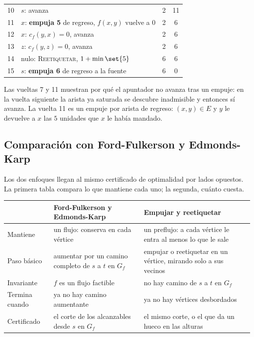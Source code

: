 \documentclass[11pt,letterpaper]{article}
\begin{document}
\begin{ejemplo}
\begin{center}
\begin{tabular}{clcc}
    10 & $s$: avanza & 2 & 11 \\
    11 & $x$: \textbf{empuja 5} de regreso, $f(x, y)$ vuelve a $0$
       & 2 & 6 \\
    12 & $x$: $c_f(y, x) = 0$, avanza & 2 & 6 \\
    13 & $z$: $c_f(y, z) = 0$, avanza & 2 & 6 \\
    14 & nulo: \textsc{Reetiquetar}, $1 + \min\set{5}$ & 6 & 6 \\
    15 & $s$: \textbf{empuja 6} de regreso a la fuente & 6 & 0 \\
    \bottomrule
  \end{tabular}
  \end{center}
  Las vueltas 7 y 11 muestran por qué el apuntador no avanza tras un
  empuje: en la vuelta siguiente la arista ya saturada se descubre
  inadmisible y entonces sí avanza. La vuelta 11 es un empuje por
  arista de regreso: $(x, y) \in E$ y $y$ le devuelve a $x$ las $5$
  unidades que $x$ le había mandado.
\end{ejemplo}


\subsection*{Comparación con Ford-Fulkerson y Edmonds-Karp}

Los dos enfoques llegan al mismo certificado de optimalidad por lados
opuestos. La primera tabla compara lo que mantiene cada uno; la
segunda, cuánto cuesta.

\begin{center}
\small
\begin{tabular}{l>{\raggedright\arraybackslash}p{5.6cm}%
                 >{\raggedright\arraybackslash}p{5.6cm}}
  \toprule
  & \textbf{Ford-Fulkerson y Edmonds-Karp}
    & \textbf{Empujar y reetiquetar} \\
  \midrule
  Mantiene & un flujo: conserva en cada vértice
           & un preflujo: a cada vértice le entra al menos lo que le
             sale \\
  \addlinespace
  Paso básico & aumentar por un camino completo de $s$ a $t$ en $G_f$
              & empujar o reetiquetar en un vértice, mirando solo a
                sus vecinos \\
  \addlinespace
  Invariante & $f$ es un flujo factible
             & no hay camino de $s$ a $t$ en $G_f$ \\
  \addlinespace
  Termina cuando & ya no hay camino aumentante
                 & ya no hay vértices desbordados \\
  \addlinespace
  Certificado & el corte de los alcanzables desde $s$ en $G_f$
              & el mismo corte, o el que da un hueco en las alturas \\
  \bottomrule
\end{tabular}
\end{center}
\end{document}
